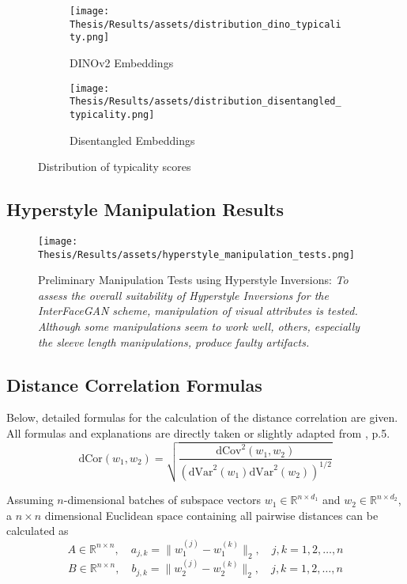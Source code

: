\begin{figure}[!ht]
     \centering
     \begin{subfigure}[b]{0.48\textwidth}
         \centering
         \texttt{[image: Thesis/Results/assets/distribution\_dino\_typicality.png]}
         \caption{DINOv2 Embeddings}
     \end{subfigure}
     \hfill
     \begin{subfigure}[b]{0.48\textwidth}
         \centering
         \texttt{[image: Thesis/Results/assets/distribution\_disentangled\_typicality.png]}
         \caption{Disentangled Embeddings}
     \end{subfigure}
     \hfill
\caption{Distribution of typicality scores}
\label{fig:typicality_score_distribution}
\end{figure}

\FloatBarrier
\subsection*{Hyperstyle Manipulation Results}
\begin{figure}[!ht]
    \centering
    \texttt{[image: Thesis/Results/assets/hyperstyle\_manipulation\_tests.png]}
    \caption[Preliminary Manipulation Tests using Hyperstyle Inversions]{Preliminary Manipulation Tests using Hyperstyle Inversions: \textit{To assess the overall suitability of Hyperstyle Inversions for the InterFaceGAN scheme, manipulation of visual attributes is tested. Although some manipulations seem to work well, others, especially the sleeve length manipulations, produce faulty artifacts.}}
    \label{fig:hyperstyle_manipulation_tests}
\end{figure}


\FloatBarrier
\newpage
\subsection*{Distance Correlation Formulas}
Below, detailed formulas for the calculation of the distance correlation are given. All formulas and explanations are directly taken or slightly adapted from \cite{muller2024disentangling}, p.5.
\begin{equation}\label{eq:dcor_formula}
\text{dCor}(w_1, w_2) = \sqrt{\frac{\text{dCov}^2(w_1, w_2)}{(\text{dVar}^2(w_1) \text{dVar}^2(w_2))^{1/2}}}
\end{equation}

Assuming \(n\)-dimensional batches of subspace vectors \(w_1 \in \mathbb{R}^{n \times d_1}\) and \(w_2 \in \mathbb{R}^{n \times d_2}\), a \(n \times n\) dimensional Euclidean space containing all pairwise distances can be calculated as
\begin{equation}
A \in \mathbb{R}^{n \times n}, \quad a_{j,k} = \|w_1^{(j)} - w_1^{(k)}\|_2, \quad j, k = 1, 2, \dots, n
\end{equation}
\begin{equation}
B \in \mathbb{R}^{n \times n}, \quad b_{j,k} = \|w_2^{(j)} - w_2^{(k)}\|_2, \quad j, k = 1, 2, \dots, n
\end{equation}


